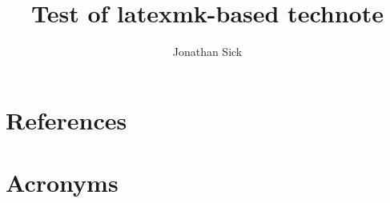 \documentclass[DM,authoryear,toc]{lsstdoc}
\title{Test of latexmk-based technote}
\author{%
Jonathan Sick
}
\date{\vcsDate}
\begin{document}
\maketitle


\appendix
\section{References} \label{sec:bib}


\section{Acronyms} \label{sec:acronyms}

\end{document}
